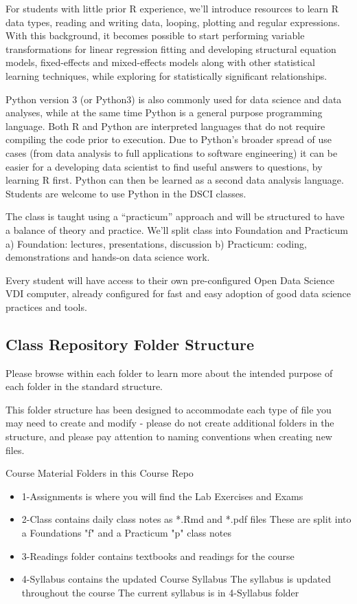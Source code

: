 \documentclass[11pt]{article} %
\begin{document}
  For students with little prior R experience, we'll introduce resources to learn R data types, reading and writing data, looping, plotting and regular expressions. 
  With this background, it becomes possible to start performing variable transformations for linear regression fitting and developing structural equation models, fixed-effects and mixed-effects models along with other statistical learning techniques, while exploring for statistically significant relationships. 
  
  Python version 3 (or Python3) is also commonly used for data science and data analyses, while at the same time Python is a general purpose programming language.  Both R and Python are interpreted languages that do not require compiling the code prior to execution.  
  Due to Python's broader spread of use cases (from data analysis to full applications to software engineering) it can be easier for a developing data scientist to find useful answers to questions, by learning R first.  
  Python can then be learned as a second data analysis language. 
  Students are welcome to use Python in the DSCI classes. 
  
  The class is taught using a ``practicum'' approach and will be structured to have a balance of theory and practice. 
  We'll split class into Foundation and Practicum
  	a) Foundation: lectures, presentations, discussion
  	b) Practicum: coding, demonstrations and hands-on data science work. 
  
  Every student will have access to their own pre-configured Open Data Science VDI computer, already configured for fast and easy adoption of good data science practices and tools. 
  
  \subsection{Class Repository Folder Structure}
    
    Please browse within each folder to learn more about the intended purpose of each folder in the standard structure. 
    
    This folder structure has been designed to accommodate each type of file you may need to create and modify - please do not create additional folders in the structure, and please pay attention to naming conventions when creating new files. 
    
    Course Material Folders in this Course Repo
      \begin{itemize}
        \item 1-Assignments is where you will find the Lab Exercises and Exams
        \item 2-Class contains daily class notes as *.Rmd and *.pdf files
        \subitem These are split into a Foundations "f" and a Practicum "p" class notes
        \item 3-Readings folder contains textbooks and readings for the course
        \item 4-Syllabus contains the updated Course Syllabus
        \subitem The syllabus is updated throughout the course
        \subitem The current syllabus is in 4-Syllabus folder
      \end{itemize}
      
\end{document}
